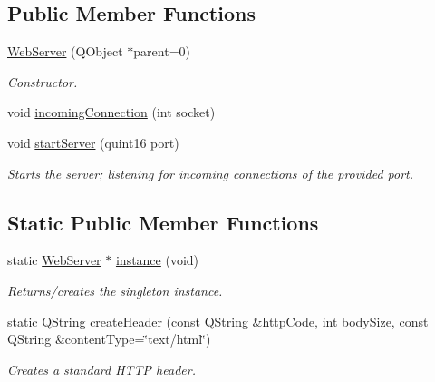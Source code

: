 \subsection*{Public Member Functions}
\begin{DoxyCompactItemize}
\item 
\mbox{\label{class_web_server_a2902a8136514bc5a1217a87b7a99ab13}} 
\hyperlink{class_web_server_a2902a8136514bc5a1217a87b7a99ab13}{Web\+Server} (Q\+Object $\ast$parent=0)
\begin{DoxyCompactList}\small\item\em Constructor. \end{DoxyCompactList}\item 
void \hyperlink{class_web_server_ac6a3155a785e42fec310e8457a12d73e}{incoming\+Connection} (int socket)
\item 
\mbox{\label{class_web_server_ad5f434853f45b795976afb32104c03b3}} 
void \hyperlink{class_web_server_ad5f434853f45b795976afb32104c03b3}{start\+Server} (quint16 port)
\begin{DoxyCompactList}\small\item\em Starts the server; listening for incoming connections of the provided port. \end{DoxyCompactList}\end{DoxyCompactItemize}
\subsection*{Static Public Member Functions}
\begin{DoxyCompactItemize}
\item 
\mbox{\label{class_web_server_a6c77ab01f931f6fed751b2496eec8077}} 
static \hyperlink{class_web_server}{Web\+Server} $\ast$ \hyperlink{class_web_server_a6c77ab01f931f6fed751b2496eec8077}{instance} (void)
\begin{DoxyCompactList}\small\item\em Returns/creates the singleton instance. \end{DoxyCompactList}\item 
\mbox{\label{class_web_server_a99f5239a06368b29ca8bfd6a24be1f98}} 
static Q\+String \hyperlink{class_web_server_a99f5239a06368b29ca8bfd6a24be1f98}{create\+Header} (const Q\+String \&http\+Code, int body\+Size, const Q\+String \&content\+Type=\char`\"{}text/html\char`\"{})
\begin{DoxyCompactList}\small\item\em Creates a standard H\+T\+TP header. \end{DoxyCompactList}\end{DoxyCompactItemize}



